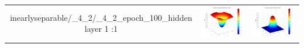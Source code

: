 \documentclass[fleqn]{article}
\begin{document}
\begin{center}
\begin{longtable}{ c | c | r  }
inearlyseparable/_4_2/_4_2_epoch_100_hidden layer 1 :1}  & \includegraphics[scale=0.25]{./pics/nonlinearlyseparable/_4_2/_4_2_epoch_100_hidden layer 2 :21} & \includegraphics[scale=0.25]{./pics/nonlinearlyseparable/_4_2/_4_2_epoch_100_output layer :1}\\ 

\end{longtable}
\end{center}
\end{document}
